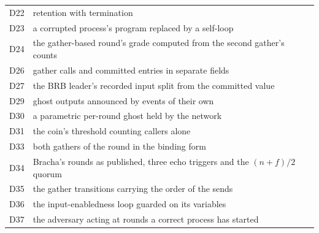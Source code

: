 \begin{center}
\begin{tabular}{lp{12cm}}
D22 & retention with termination \\
D23 & a corrupted process's program replaced by a self-loop \\
D24 & the gather-based round's grade computed from the second gather's counts \\
D26 & gather calls and committed entries in separate fields \\
D27 & the BRB leader's recorded input split from the committed value \\
D29 & ghost outputs announced by events of their own \\
D30 & a parametric per-round ghost held by the network \\
D31 & the coin's threshold counting callers alone \\
D33 & both gathers of the round in the binding form \\
D34 & Bracha's rounds as published, three echo triggers and the $(n+f)/2$ quorum \\
D35 & the gather transitions carrying the order of the sends \\
D36 & the input-enabledness loop guarded on its variables \\
D37 & the adversary acting at rounds a correct process has started \\
\hline
\end{tabular}
\end{center}

